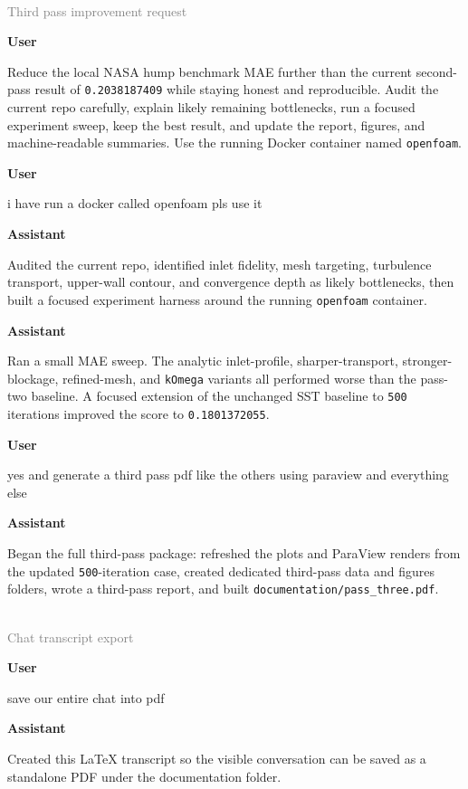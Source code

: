 \documentclass[11pt]{article}
\newcommand{\turnheader}[2]{
  \vspace{0.8em}
  \noindent{\large\textbf{#1}}\\
  \noindent\textcolor{gray}{#2}
  \vspace{0.35em}
}
\newenvironment{chatuser}
  {\par\noindent\color{userblue}\textbf{User}\par\noindent\begin{minipage}{\linewidth}\raggedright}
  {\end{minipage}\par}
\newenvironment{chatassistant}
  {\par\noindent\color{assistantgreen}\textbf{Assistant}\par\noindent\begin{minipage}{\linewidth}\raggedright}
  {\end{minipage}\par}
\begin{document}
\turnheader{Turn 8}{Third pass improvement request}
\begin{chatuser}
Reduce the local NASA hump benchmark MAE further than the current second-pass result of \texttt{0.2038187409} while staying honest and reproducible. Audit the current repo carefully, explain likely remaining bottlenecks, run a focused experiment sweep, keep the best result, and update the report, figures, and machine-readable summaries. Use the running Docker container named \texttt{openfoam}.
\end{chatuser}

\begin{chatuser}
i have run a docker called openfoam pls use it
\end{chatuser}

\begin{chatassistant}
Audited the current repo, identified inlet fidelity, mesh targeting, turbulence transport, upper-wall contour, and convergence depth as likely bottlenecks, then built a focused experiment harness around the running \texttt{openfoam} container.
\end{chatassistant}

\begin{chatassistant}
Ran a small MAE sweep. The analytic inlet-profile, sharper-transport, stronger-blockage, refined-mesh, and \texttt{kOmega} variants all performed worse than the pass-two baseline. A focused extension of the unchanged SST baseline to \texttt{500} iterations improved the score to \texttt{0.1801372055}.
\end{chatassistant}

\begin{chatuser}
yes and generate a third pass pdf like the others using paraview and everything else
\end{chatuser}

\begin{chatassistant}
Began the full third-pass package: refreshed the plots and ParaView renders from the updated \texttt{500}-iteration case, created dedicated third-pass data and figures folders, wrote a third-pass report, and built \texttt{documentation/pass\_three.pdf}.
\end{chatassistant}

\turnheader{Turn 9}{Chat transcript export}
\begin{chatuser}
save our entire chat into pdf
\end{chatuser}

\begin{chatassistant}
Created this LaTeX transcript so the visible conversation can be saved as a standalone PDF under the documentation folder.
\end{chatassistant}
\end{document}
